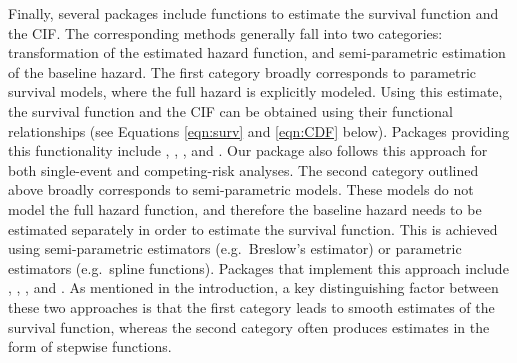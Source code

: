 Finally, several packages include functions to estimate the survival
function and the CIF. The corresponding methods generally fall into two
categories: transformation of the estimated hazard function, and
semi-parametric estimation of the baseline hazard. The first category
broadly corresponds to parametric survival models, where the full hazard
is explicitly modeled. Using this estimate, the survival function and
the CIF can be obtained using their functional relationships (see
Equations \ref{eqn:surv} and \ref{eqn:CDF} below). Packages providing
this functionality include , , , and
. Our package  also follows this approach
for both single-event and competing-risk analyses. The second category
outlined above broadly corresponds to semi-parametric models. These
models do not model the full hazard function, and therefore the baseline
hazard needs to be estimated separately in order to estimate the
survival function. This is achieved using semi-parametric estimators
(e.g.~Breslow's estimator) or parametric estimators (e.g.~spline
functions). Packages that implement this approach include
, , , and . As
mentioned in the introduction, a key distinguishing factor between these
two approaches is that the first category leads to smooth estimates of
the survival function, whereas the second category often produces
estimates in the form of stepwise functions.

